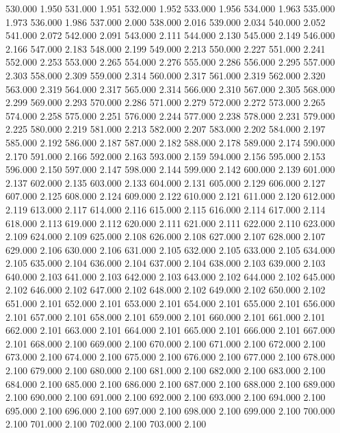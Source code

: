 530.000 1.950 
531.000 1.951 
532.000 1.952 
533.000 1.956 
534.000 1.963 
535.000 1.973 
536.000 1.986 
537.000 2.000 
538.000 2.016 
539.000 2.034 
540.000 2.052 
541.000 2.072 
542.000 2.091 
543.000 2.111 
544.000 2.130 
545.000 2.149 
546.000 2.166 
547.000 2.183 
548.000 2.199 
549.000 2.213 
550.000 2.227 
551.000 2.241 
552.000 2.253 
553.000 2.265 
554.000 2.276 
555.000 2.286 
556.000 2.295 
557.000 2.303 
558.000 2.309 
559.000 2.314 
560.000 2.317 
561.000 2.319 
562.000 2.320 
563.000 2.319 
564.000 2.317 
565.000 2.314 
566.000 2.310 
567.000 2.305 
568.000 2.299 
569.000 2.293 
570.000 2.286 
571.000 2.279 
572.000 2.272 
573.000 2.265 
574.000 2.258 
575.000 2.251 
576.000 2.244 
577.000 2.238 
578.000 2.231 
579.000 2.225 
580.000 2.219 
581.000 2.213 
582.000 2.207 
583.000 2.202 
584.000 2.197 
585.000 2.192 
586.000 2.187 
587.000 2.182 
588.000 2.178 
589.000 2.174 
590.000 2.170 
591.000 2.166 
592.000 2.163 
593.000 2.159 
594.000 2.156 
595.000 2.153 
596.000 2.150 
597.000 2.147 
598.000 2.144 
599.000 2.142 
600.000 2.139 
601.000 2.137 
602.000 2.135 
603.000 2.133 
604.000 2.131 
605.000 2.129 
606.000 2.127 
607.000 2.125 
608.000 2.124 
609.000 2.122 
610.000 2.121 
611.000 2.120 
612.000 2.119 
613.000 2.117 
614.000 2.116 
615.000 2.115 
616.000 2.114 
617.000 2.114 
618.000 2.113 
619.000 2.112 
620.000 2.111 
621.000 2.111 
622.000 2.110 
623.000 2.109 
624.000 2.109 
625.000 2.108 
626.000 2.108 
627.000 2.107 
628.000 2.107 
629.000 2.106 
630.000 2.106 
631.000 2.105 
632.000 2.105 
633.000 2.105 
634.000 2.105 
635.000 2.104 
636.000 2.104 
637.000 2.104 
638.000 2.103 
639.000 2.103 
640.000 2.103 
641.000 2.103 
642.000 2.103 
643.000 2.102 
644.000 2.102 
645.000 2.102 
646.000 2.102 
647.000 2.102 
648.000 2.102 
649.000 2.102 
650.000 2.102 
651.000 2.101 
652.000 2.101 
653.000 2.101 
654.000 2.101 
655.000 2.101 
656.000 2.101 
657.000 2.101 
658.000 2.101 
659.000 2.101 
660.000 2.101 
661.000 2.101 
662.000 2.101 
663.000 2.101 
664.000 2.101 
665.000 2.101 
666.000 2.101 
667.000 2.101 
668.000 2.100 
669.000 2.100 
670.000 2.100 
671.000 2.100 
672.000 2.100 
673.000 2.100 
674.000 2.100 
675.000 2.100 
676.000 2.100 
677.000 2.100 
678.000 2.100 
679.000 2.100 
680.000 2.100 
681.000 2.100 
682.000 2.100 
683.000 2.100 
684.000 2.100 
685.000 2.100 
686.000 2.100 
687.000 2.100 
688.000 2.100 
689.000 2.100 
690.000 2.100 
691.000 2.100 
692.000 2.100 
693.000 2.100 
694.000 2.100 
695.000 2.100 
696.000 2.100 
697.000 2.100 
698.000 2.100 
699.000 2.100 
700.000 2.100 
701.000 2.100 
702.000 2.100 
703.000 2.100 
